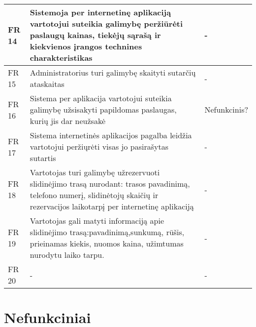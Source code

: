 \documentclass[oneside]{VUMIFPSkursinis}
\begin{document}
\begin{longtable}{ | p{}|p{}|p{}| }
	FR 14 & Sistemoja per internetinę aplikaciją vartotojui suteikia galimybę peržiūrėti paslaugų kainas, tiekėjų sąrašą ir kiekvienos įrangos technines charakteristikas & - \\ \hline
	FR 15 & Administratorius turi galimybę skaityti sutarčių ataskaitas & - \\ \hline
	FR 16 & Sistema per aplikacija vartotojui suteikia galimybę užsisakyti papildomas paslaugas, kurių jis dar neužsakė & Nefunkcinis? \\ \hline
	FR 17 & Sistema internetinės aplikacijos pagalba leidžia vartotojui peržiųrėti visas jo pasirašytas sutartis & - \\ \hline
	FR 18 &  Vartotojas turi galimybę užrezervuoti slidinėjimo trasą nurodant: trasos pavadinimą, telefono numerį, slidinėtojų skaičių ir rezervacijos laikotarpį per internetinę aplikaciją & - \\ \hline
	FR 19 &  Vartotojas gali matyti informaciją apie slidinėjimo trasą:pavadinimą,sunkumą, rūšis, prieinamas kiekis, nuomos kaina, užimtumas nurodytu laiko tarpu. & - \\ \hline
	FR 20 & - & - \\ \hline
	\end{longtable}

 
\section{Nefunkciniai}
\end{document}
